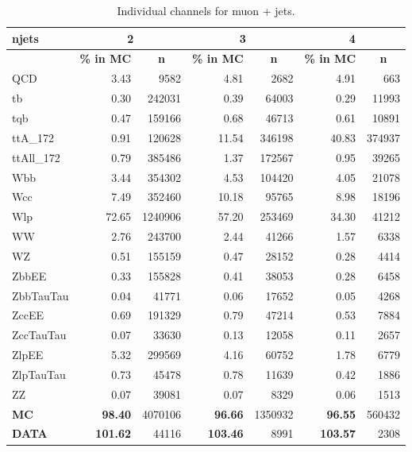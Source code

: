 \begin{table}[hb] \footnotesize
\centering
\caption{Individual channels for muon + jets.}
\begin{tabular}{|l|r|r|r|r|r|r|}
\hline
\textbf{njets} & \multicolumn{2}{c|}{\textbf{2}} & \multicolumn{2}{c|}{\textbf{3}} & \multicolumn{2}{c|}{\textbf{4}} \\ \hline
\textsf{} & \multicolumn{1}{l|}{\textbf{\% in MC}} & \multicolumn{1}{c|}{\textbf{n}} & \multicolumn{1}{l|}{\textbf{\% in MC}} & \multicolumn{1}{c|}{\textbf{n}} & \multicolumn{1}{l|}{\textbf{\% in MC}} & \multicolumn{1}{c|}{\textbf{n}} \\ \hline
\textsf{QCD} & 3.43 & 9582 & 4.81 & 2682 & 4.91 & 663 \\ \hline
\textsf{tb} & 0.30 & 242031 & 0.39 & 64003 & 0.29 & 11993 \\ \hline
\textsf{tqb} & 0.47 & 159166 & 0.68 & 46713 & 0.61 & 10891 \\ \hline
\textsf{ttA\_172} & 0.91 & 120628 & 11.54 & 346198 & 40.83 & 374937 \\ \hline
\textsf{ttAll\_172} & 0.79 & 385486 & 1.37 & 172567 & 0.95 & 39265 \\ \hline
\textsf{Wbb} & 3.44 & 354302 & 4.53 & 104420 & 4.05 & 21078 \\ \hline
\textsf{Wcc} & 7.49 & 352460 & 10.18 & 95765 & 8.98 & 18196 \\ \hline
\textsf{Wlp} & 72.65 & 1240906 & 57.20 & 253469 & 34.30 & 41212 \\ \hline
\textsf{WW} & 2.76 & 243700 & 2.44 & 41266 & 1.57 & 6338 \\ \hline
\textsf{WZ} & 0.51 & 155159 & 0.47 & 28152 & 0.28 & 4414 \\ \hline
\textsf{ZbbEE} & 0.33 & 155828 & 0.41 & 38053 & 0.28 & 6458 \\ \hline
\textsf{ZbbTauTau} & 0.04 & 41771 & 0.06 & 17652 & 0.05 & 4268 \\ \hline
\textsf{ZccEE} & 0.69 & 191329 & 0.79 & 47214 & 0.53 & 7884 \\ \hline
\textsf{ZccTauTau} & 0.07 & 33630 & 0.13 & 12058 & 0.11 & 2657 \\ \hline
\textsf{ZlpEE} & 5.32 & 299569 & 4.16 & 60752 & 1.78 & 6779 \\ \hline
\textsf{ZlpTauTau} & 0.73 & 45478 & 0.78 & 11639 & 0.42 & 1886 \\ \hline
\textsf{ZZ} & 0.07 & 39081 & 0.07 & 8329 & 0.06 & 1513 \\ \hline \hline
\textbf{MC} & \textbf{98.40} & 4070106 & \textbf{96.66} & 1350932 & \textbf{96.55} & 560432 \\ \hline
\textbf{DATA} & \textbf{101.62} & 44116 & \textbf{103.46} & 8991 & \textbf{103.57} & 2308 \\ \hline
\end{tabular}
\label{tab:chnl-muo}
\end{table}
